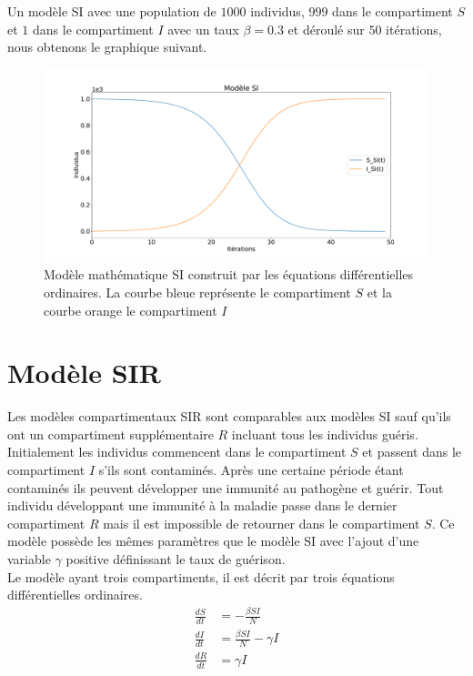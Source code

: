 \newpage

Un modèle SI avec une population de $1000$ individus, $999$ dans le compartiment $S$ et $1$ dans le compartiment $I$ avec un taux $\beta = 0.3$  et déroulé sur $50$ itérations, nous obtenons le graphique suivant.

\begin{figure}[h]
\centering
\captionsetup{justification=centering}
\includegraphics[width=1\textwidth]{Images/SI_exemple.pdf}
\caption[Modèle mathématique SI]{Modèle mathématique SI construit par les équations différentielles ordinaires. La courbe bleue représente le compartiment $S$ et la courbe orange le compartiment $I$}
\end{figure}

\section{Modèle SIR}

Les modèles compartimentaux SIR sont comparables aux modèles SI sauf qu'ils ont un compartiment supplémentaire $R$ incluant tous les individus guéris. Initialement les individus commencent dans le compartiment $S$ et passent dans le compartiment $I$ s'ils sont contaminés. Après une certaine période étant contaminés ils peuvent développer une immunité au pathogène et guérir. Tout individu développant une immunité à la maladie passe dans le dernier compartiment $R$ mais il est impossible de retourner dans le compartiment $S$. Ce modèle possède les mêmes paramètres que le modèle SI avec l'ajout d'une variable $\gamma$ positive définissant le taux de guérison.\\

Le modèle ayant trois compartiments, il est décrit par trois équations différentielles ordinaires.
\begin{align}
    \frac{dS}{dt} &= -\frac{\beta S I}{N}\\
    \frac{dI}{dt} &= \frac{\beta S I}{N} - \gamma I\\
    \frac{dR}{dt} &= \gamma I
\end{align}


